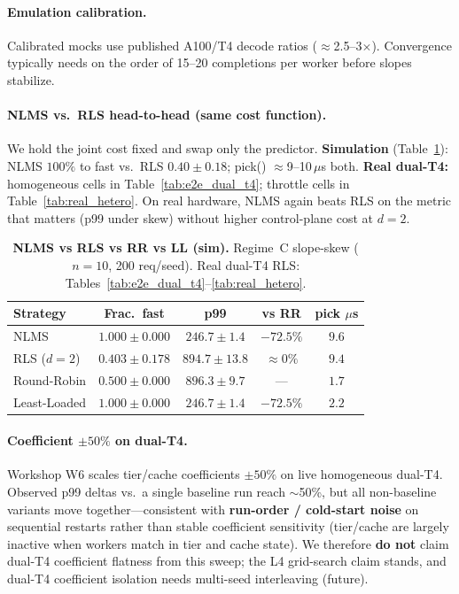 \documentclass[10pt,twocolumn,letterpaper]{article}
\begin{document}
\paragraph{Emulation calibration.}
Calibrated mocks use published A100/T4 decode ratios ($\approx$2.5--3$\times$). Convergence typically needs on the order of 15--20 completions per worker before slopes stabilize.

\paragraph{NLMS vs.\ RLS head-to-head (same cost function).}
\label{sec:rls_h2h}
We hold the joint cost fixed and swap only the predictor. \textbf{Simulation} (Table~\ref{tab:rls_h2h}): NLMS $100\%$ to fast vs.\ RLS $0.40\pm0.18$; pick() $\approx$9--10\,$\mu$s both. \textbf{Real dual-T4:} homogeneous cells in Table~\ref{tab:e2e_dual_t4}; throttle cells in Table~\ref{tab:real_hetero}. On real hardware, NLMS again beats RLS on the metric that matters (p99 under skew) without higher control-plane cost at $d{=}2$.

\begin{table}[t]
\centering
\scriptsize
\setlength{\tabcolsep}{2.5pt}
\begin{tabular}{@{}lcccc@{}}
\toprule
\textbf{Strategy} & \textbf{Frac.\ fast} & \textbf{p99} & \textbf{vs RR} & \textbf{pick $\mu$s} \\
\midrule
NLMS & $1.000\pm0.000$ & $246.7\pm1.4$ & $-72.5\%$ & $9.6$ \\
RLS ($d{=}2$) & $0.403\pm0.178$ & $894.7\pm13.8$ & $\approx 0\%$ & $9.4$ \\
Round-Robin & $0.500\pm0.000$ & $896.3\pm9.7$ & --- & $1.7$ \\
Least-Loaded & $1.000\pm0.000$ & $246.7\pm1.4$ & $-72.5\%$ & $2.2$ \\
\bottomrule
\end{tabular}
\caption{\textbf{NLMS vs RLS vs RR vs LL (sim).} Regime~C slope-skew ($n{=}10$, 200 req/seed). Real dual-T4 RLS: Tables~\ref{tab:e2e_dual_t4}--\ref{tab:real_hetero}.}
\label{tab:rls_h2h}
\end{table}

\paragraph{Coefficient $\pm50\%$ on dual-T4.}
Workshop W6 scales tier/cache coefficients $\pm50\%$ on live homogeneous dual-T4. Observed p99 deltas vs.\ a single baseline run reach $\sim$50\%, but all non-baseline variants move together---consistent with \textbf{run-order / cold-start noise} on sequential restarts rather than stable coefficient sensitivity (tier/cache are largely inactive when workers match in tier and cache state). We therefore \textbf{do not} claim dual-T4 coefficient flatness from this sweep; the L4 grid-search claim stands, and dual-T4 coefficient isolation needs multi-seed interleaving (future).
\end{document}
